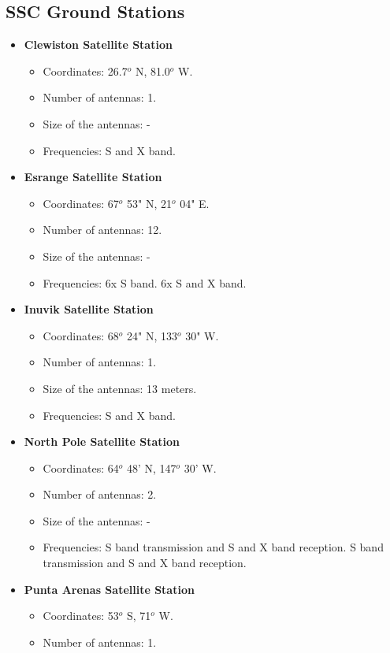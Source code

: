 \subsection{SSC Ground Stations}
\begin{itemize}
\item \textbf{Clewiston Satellite Station}
\begin{itemize}
\item Coordinates: 26.7$^{o}$ N, 81.0$^{o}$ W.
\item Number of antennas: 1.
\item Size of the antennas: -
\item Frequencies: S and X band.
\end{itemize}
\item \textbf{Esrange Satellite Station}
\begin{itemize}
\item Coordinates: 67$^{o}$ 53" N, 21$^{o}$ 04" E.
\item Number of antennas: 12.
\item Size of the antennas: -
\item Frequencies: 6x S band. 6x S and X band.
\end{itemize}
\item \textbf{Inuvik Satellite Station}
\begin{itemize}
\item Coordinates: 68$^{o}$ 24" N, 133$^{o}$ 30" W.
\item Number of antennas: 1.
\item Size of the antennas: 13 meters.
\item Frequencies: S and X band.
\end{itemize}
\item \textbf{North Pole Satellite Station}
\begin{itemize}
\item Coordinates: 64$^{o}$ 48' N, 147$^{o}$ 30' W.
\item Number of antennas: 2.
\item Size of the antennas: -
\item Frequencies: S band transmission and S and X band reception. S band transmission and S and X band reception.
\end{itemize}
\item \textbf{Punta Arenas Satellite Station}
\begin{itemize}
\item Coordinates: 53$^{o}$ S, 71$^{o}$ W.
\item Number of antennas: 1.

\end{itemize}
\end{itemize}
